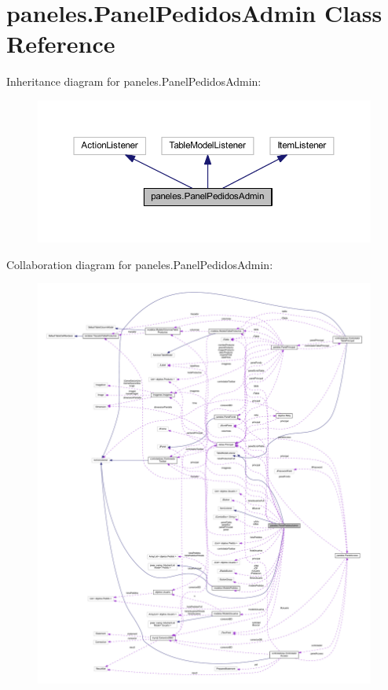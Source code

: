\hypertarget{classpaneles_1_1_panel_pedidos_admin}{}\section{paneles.\+Panel\+Pedidos\+Admin Class Reference}
\label{classpaneles_1_1_panel_pedidos_admin}


Inheritance diagram for paneles.\+Panel\+Pedidos\+Admin\+:
\nopagebreak
\begin{figure}[H]
\begin{center}
\leavevmode
\includegraphics[width=350pt]{classpaneles_1_1_panel_pedidos_admin__inherit__graph}
\end{center}
\end{figure}


Collaboration diagram for paneles.\+Panel\+Pedidos\+Admin\+:
\nopagebreak
\begin{figure}[H]
\begin{center}
\leavevmode
\includegraphics[width=350pt]{classpaneles_1_1_panel_pedidos_admin__coll__graph}
\end{center}
\end{figure}
